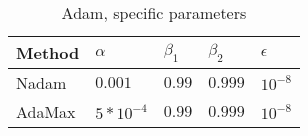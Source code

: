 \begin{center}
    \begin{table}[htbp]
    \caption{Adam, specific parameters}
    \label{tab:ensemble-params}
\begin{tabular}{ p{6.0cm} p{1.5cm} p{1.5cm} p{1.5cm} p{1.5cm}  }
    \hline
    Method     & $\alpha$ & $\beta_1 $ & $\beta_2$ &   $\epsilon$ \\
    \hline
    Nadam
            & $0.001$ & $0.99$ & $0.999$ & $10^{-8}$ \\%
    AdaMax
            & $5*10^{-4}$ & $0.99$ & $0.999$ & $10^{-8}$ \\%
    \hline
\end{tabular}
    \end{table}
\end{center}